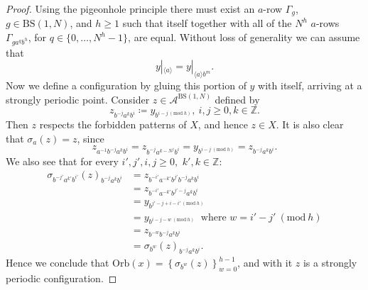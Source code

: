 \documentclass[letterpaper,10pt]{amsart}
\theoremstyle{plain}
\newcommand{\BS}[1][N]{\mathrm{BS}(1,#1)}
\begin{document}
\begin{proof}
		
		 Using the pigeonhole principle there must exist an $a$-row $\Gamma_g$, $g\in \BS$, and $h\ge 1$ such that itself together with all of the $N^h$ $a$-rows $\Gamma_{ga^{q}b^h}$, for $q\in \{0,\ldots,N^h-1\}$, are equal. Without loss of generality we can assume that
	$$
	y|_{\langle a\rangle}=y|_{\langle a\rangle b^m}.
	$$
	Now we define a configuration by gluing this portion of $y$ with itself, arriving at a strongly periodic point. Consider $z\in \mathcal{A}^{\BS}$ defined by
	\begin{equation*}
	z_{b^{-j}a^kb^i}\coloneqq y_{b^{i-j \ (\mathrm{mod} \ h)} }, \ i,j\ge 0, k\in \mathbb{Z}.
	\end{equation*}
	Then $z$ respects the forbidden patterns of $X$, and hence $z\in X$. It is also clear that $\sigma_{a}(z)=z$, since
	$$
	z_{a^{-1}b^{-j}a^kb^i}=z_{b^{-j}a^{k-N^j}b^i}=y_{b^{i-j \ (\mathrm{mod} \ h)}}= z_{b^{-j}a^kb^i}.
	$$	
	We also see that for every $i',j',i,j\ge 0,$ $k',k\in \mathbb{Z}$:
	\begin{align*}
	\sigma_{b^{-j'}a^{k'}b^{i'}}(z)_{b^{-j}a^{k}b^i}&=z_{b^{-i'}a^{-k'}b^{j'}b^{-j}a^{k}b^i}\\
	&=z_{b^{-i'}a^{-k'}b^{j'-j}a^{k}b^i}\\
	&=y_{b^{j'-j+i-i'\ (\mathrm{mod} \ h)}}\\
	&=y_{b^{i-j-w\ (\mathrm{mod} \ h)}} \ \text{ where } w=i'-j'\ (\mathrm{mod} \ h)\\
	&=z_{b^{-w}b^ {-j}a^k b^i}\\
	&=\sigma_{b^w}(z)_{b^{-j}a^kb^i}.
	\end{align*}
	Hence we conclude that $\mathrm{Orb}(x)=\left\{ \sigma_{b^w}(z)\right\}_{w=0}^{h-1}$, and with it $z$ is a strongly periodic configuration.
	\end{proof}
\end{document}
